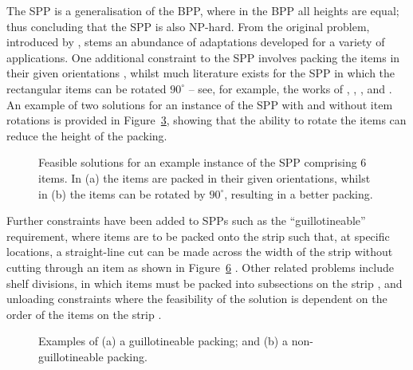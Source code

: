 \documentclass[a4paper,11pt]{article}
\begin{document}
The SPP is a generalisation of the BPP, where in the BPP all heights are equal; thus concluding that the SPP is also NP-hard. From the original problem, introduced by \citet{baker1980}, stems an abundance of adaptations developed for a variety of applications. One additional constraint to the SPP involves packing the items in their given orientations \citep{ntene2008}, whilst much literature exists for the SPP in which the rectangular items can be rotated $90^{\circ}$ -- see, for example, the works of \cite{jansen2005}, \citet{kenmochi2009}, \citet{cui2013}, and \citet{he2013}. An example of two solutions for an instance of the SPP with and without item rotations is provided in Figure~\ref{fig:spp}, showing that the ability to rotate the items can reduce the height of the packing. 

\begin{figure}[h!]
	\centering	
	\begin{subfigure}[h]{0.47\textwidth}
		\centering
		
		\caption{}
		\label{fig:sppnorotation}
	\end{subfigure} %
	\begin{subfigure}[h]{0.47\textwidth}
		\centering
		
		\caption{}
		\label{fig:spprotation}
	\end{subfigure}	
	\caption{Feasible solutions for an example instance of the SPP comprising 6 items. In (a) the items are packed in their given orientations, whilst in (b) the items can be rotated by $90^{\circ}$, resulting in a better packing.}	
	\label{fig:spp}
\end{figure}

\noindent Further constraints have been added to SPPs such as the ``guillotineable'' requirement, where items are to be packed onto the strip such that, at specific locations, a straight-line cut can be made across the width of the strip without cutting through an item as shown in Figure~\ref{fig:guillospp} \citep{kroger1995, hifi1998}. Other related problems include shelf divisions, in which items must be packed into subsections on the strip \citep{xavier2008}, and unloading constraints where the feasibility of the solution is dependent on the order of the items on the strip \citep{dasilveira2013}.

\begin{figure}[h!]
	\centering	
	\begin{subfigure}[h]{0.4\textwidth}
		\centering
		
		\caption{}
		\label{fig:guillotine}
	\end{subfigure} %
	\begin{subfigure}[h]{0.4\textwidth}
		\centering
		
		\caption{}
		\label{fig:nonguillotine}
	\end{subfigure}	
	\caption{Examples of (a) a guillotineable packing; and (b) a non-guillotineable packing.}	
	\label{fig:guillospp}
\end{figure}
\end{document}
